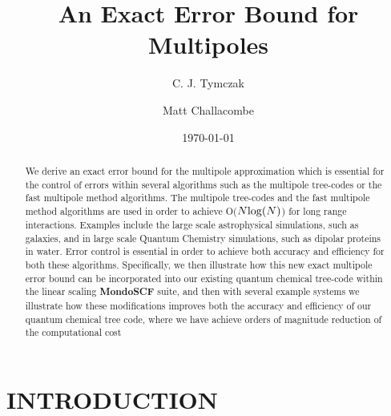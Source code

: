 \documentclass[prb,aps,nobibnotes,superbib,preprint]{revtex4}
\begin{document}
\title{An Exact Error Bound for Multipoles}

\author{C. J. Tymczak}
\author{Matt Challacombe}


\date{\today}

\begin{abstract}
We derive an exact error bound for the multipole approximation which is essential for the control of
errors within several algorithms such as the multipole tree-codes 
or the fast multipole method algorithms. 
%
The multipole tree-codes and the fast multipole method algorithms 
are used in order to achieve {\cal O}($N {\rm log}(N)$) for long range interactions.
Examples include the
large scale astrophysical 
simulations, such as galaxies, and in large scale  Quantum Chemistry simulations, such as dipolar proteins in water. 
%
Error control is essential in order to achieve both  accuracy and efficiency for both these algorithms. 
%
Specifically, we then illustrate how this new exact multipole error bound can be incorporated into our existing 
quantum chemical tree-code within the linear scaling {\bf MondoSCF} suite,  
and then with several example systems we illustrate how these modifications improves both the accuracy and 
efficiency of our quantum chemical tree code, where we have achieve orders of magnitude reduction of the
computational cost
\end{abstract}


\maketitle




\section{INTRODUCTION}
\end{document}
